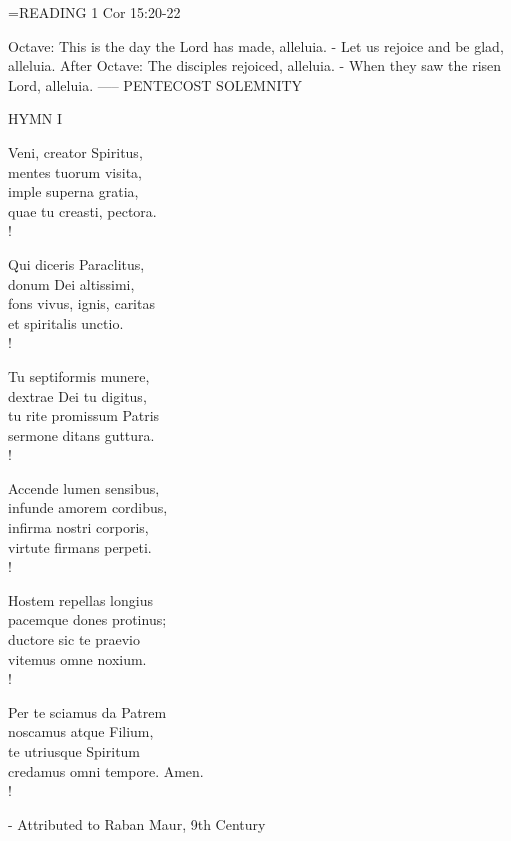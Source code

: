 \hangindent=\parindent \small{READING}    1 Cor 15:20-22 \textbf{   }

Octave:	This is the day the Lord has made, alleluia.
		- Let us rejoice and be glad, alleluia.
After Octave:	The disciples rejoiced, alleluia.
		- When they saw the risen Lord, alleluia.
-----
PENTECOST
SOLEMNITY

\noindent\small{\uppercase{Hymn I}}\normalsize
\begin{cverse}
Veni, creator Spiritus,\\
mentes tuorum visita,\\
imple superna gratia,\\
quae tu creasti, pectora.\\!

Qui diceris Paraclitus,\\
donum Dei altissimi,\\
fons vivus, ignis, caritas\\
et spiritalis unctio.\\!

Tu septiformis munere,\\
dextrae Dei tu digitus,\\
tu rite promissum Patris\\
sermone ditans guttura.\\!

Accende lumen sensibus,\\
infunde amorem cordibus,\\
infirma nostri corporis,\\
virtute firmans perpeti.\\!

Hostem repellas longius\\
pacemque dones protinus;\\
ductore sic te praevio\\
vitemus omne noxium.\\!

Per te sciamus da Patrem\\
noscamus atque Filium,\\
te utriusque Spiritum\\
credamus omni tempore. Amen.\\!
\end{cverse}
- Attributed to Raban Maur, 9th Century

